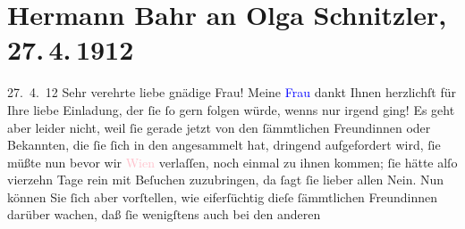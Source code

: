 

               \section[Hermann Bahr an Olga Schnitzler, 27. 4. 1912]{ Hermann Bahr an Olga Schnitzler, 27. 4. 1912}\nopagebreak{}\rehead{ }\normalsize\beginnumbering{} \toendnotes[C]{\smallbreak\pagebreak[2]} 
\toendnotes[C]{\smallbreak}\pstart
           \raggedleft{}{\pb}27. 4. 12\pend
           \pstart\center{}Sehr verehrte liebe gnädige Frau!\pend\pstart
           Meine \textcolor{blue}{Frau}{} dankt Ihnen
                    herzlichſt für Ihre liebe Einladung, der ſie ſo gern folgen würde, wenns nur
                    irgend ging! Es geht aber leider nicht, weil ſie gerade jetzt von den
                    ſämmtlichen Freundinnen oder Bekannten, die ſie ſich in den \label{K_L02060_1v}\label{K_L02060_1h} angesammelt hat, dringend
                    aufgefordert wird, ſie müßte nun bevor wir \textcolor{pink}{Wien}{}\ledrightnote{\textcolor{pink}{Wien}}
                    verlaſſen, noch einmal zu ihnen kommen; ſie hätte alſo vierzehn Tage rein mit
                    Beſuchen zuzubringen, da ſagt ſie lieber allen Nein. Nun können Sie ſich aber
                    vorſtellen, wie eiferſüchtig {\pb}dieſe
                    ſämmtlichen Freundinnen darüber wachen, daß ſie wenigſtens auch bei den anderen
